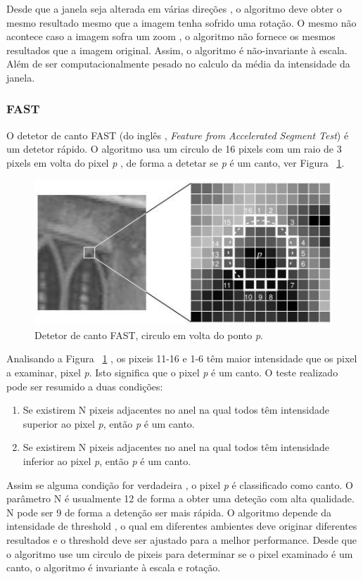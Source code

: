 Desde que a janela seja alterada em várias direções , o algoritmo deve obter o mesmo resultado mesmo que a imagem tenha sofrido uma rotação. O mesmo não acontece caso a imagem sofra um zoom , o algoritmo não fornece os mesmos resultados que a imagem original. Assim, o algoritmo é não-invariante à escala. Além de ser computacionalmente pesado no calculo da média da intensidade da janela. %


\subsubsection{FAST}\label{fastsection}

O detetor de canto FAST (do inglês ,\textit{ Feature from Accelerated Segment Test}) é um detetor rápido. O algoritmo usa um circulo de 16 pixels com um raio de 3 pixels em volta do pixel \textit{p} , de forma a detetar se \textit{p} é um canto, ver Figura ~\ref{fig:fastcornerdetector}.

\begin{figure}[h!]
	\centering
	\includegraphics[width=0.7\linewidth]{figures/FASTcornerdetector}
	\caption{Detetor de canto FAST, circulo em volta do ponto \textit{p}. \cite{VisualOdometryRodasVehicles}}
	\label{fig:fastcornerdetector}
\end{figure}

Analisando a Figura  ~\ref{fig:fastcornerdetector} , os pixeis 11-16 e 1-6 têm maior intensidade que os pixel a examinar, pixel \textit{p}. Isto significa que o pixel \textit{p} é um canto. O teste realizado pode ser resumido a duas condições:
\begin{enumerate}
	\item Se existirem N pixeis adjacentes no anel na qual todos têm intensidade superior ao pixel \textit{p}, então \textit{p} é um canto.
	\item Se existirem N pixeis adjacentes no anel na qual todos têm intensidade inferior ao pixel \textit{p}, então \textit{p} é um canto.	
\end{enumerate}
Assim se alguma condição for verdadeira , o pixel \textit{p} é classificado como canto. O parâmetro N é usualmente 12 de forma a obter uma deteção com alta qualidade. N pode ser 9 de forma a detenção ser mais rápida. 
O algoritmo depende da intensidade de threshold , o qual em diferentes ambientes deve originar diferentes resultados e o threshold deve ser ajustado para a melhor performance. Desde que o algoritmo use um circulo de pixeis para determinar se o pixel examinado é um canto, o algoritmo é invariante à escala e rotação.



